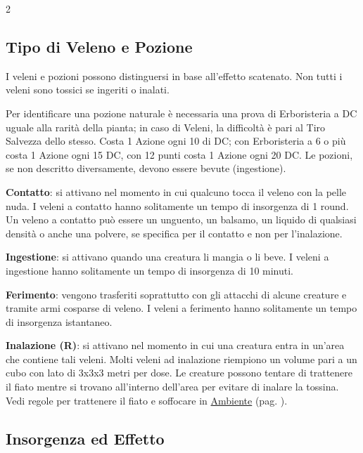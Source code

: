 \begin{multicols}{2}

\subsection{Tipo di Veleno e Pozione}\label{tipidiveleno}

I veleni e pozioni possono distinguersi in base all'effetto scatenato.
Non tutti i veleni sono tossici se ingeriti o inalati.

Per identificare una pozione naturale è necessaria una prova di Erboristeria a DC uguale alla rarità della pianta; in caso di Veleni, la difficoltà è pari al Tiro Salvezza dello stesso. Costa 1 Azione ogni 10 di DC; con Erboristeria a 6 o più costa 1 Azione ogni 15 DC, con 12 punti costa 1 Azione ogni 20 DC. Le pozioni, se non descritto diversamente, devono essere bevute (ingestione).

\textbf{Contatto}: si attivano nel momento in cui qualcuno tocca il veleno con la pelle nuda. I veleni a contatto hanno solitamente un tempo di insorgenza di 1 round. Un veleno a contatto può essere un unguento, un balsamo, un liquido di qualsiasi densità o anche una polvere, se specifica per il contatto e non per l'inalazione.

\textbf{Ingestione}: si attivano quando una creatura li mangia o li beve. I veleni a ingestione hanno solitamente un tempo di insorgenza di 10 minuti.

\textbf{Ferimento}: vengono trasferiti soprattutto con gli attacchi di alcune creature e tramite armi cosparse di veleno. I veleni a ferimento hanno solitamente un tempo di insorgenza istantaneo.

\textbf{Inalazione (R)}: si attivano nel momento in cui una creatura entra in un'area che contiene tali veleni. Molti veleni ad inalazione riempiono un volume pari a un cubo con lato di 3x3x3 metri per dose. Le creature possono tentare di trattenere il fiato mentre si trovano all'interno dell'area per evitare di inalare la tossina.
Vedi regole per trattenere il fiato e soffocare in \hyperlink{trattenereilfiato}{Ambiente} (pag. \pageref{trattenereilfiato}).

\subsection{Insorgenza ed Effetto}\label{insorgenzaveleno}\hypertarget{insorgenzaveleno}{}


\end{multicols}
